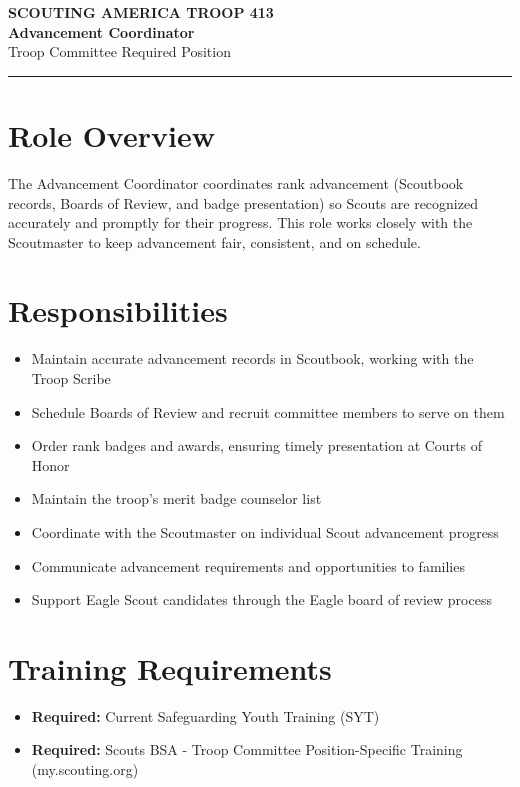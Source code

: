 \documentclass[11pt, letterpaper]{article}
\begin{document}
\begin{center}
  {\small\color{scoutgreen}\textbf{SCOUTING AMERICA \textbullet{} TROOP 413}} \\[4pt]
  {\fontsize{20pt}{24pt}\selectfont\bfseries\color{scoutgreen} Advancement Coordinator} \\[4pt]
  {\large\color{accent} Troop Committee \textbullet{} Required Position} \\[4pt]
  \textcolor{accent}{\rule{0.6\linewidth}{1pt}}
\end{center}

\vspace{0.3em}

\begin{minipage}[t]{0.48\linewidth}
\raggedright

\section{Role Overview}
The Advancement Coordinator coordinates rank advancement (Scoutbook records, Boards of Review, and badge presentation) so Scouts are recognized accurately and promptly for their progress. This role works closely with the Scoutmaster to keep advancement fair, consistent, and on schedule.

\vspace{0.4em}
\section{Responsibilities}
\begin{itemize}
  \item Maintain accurate advancement records in Scoutbook, working with the Troop Scribe
  \item Schedule Boards of Review and recruit committee members to serve on them
  \item Order rank badges and awards, ensuring timely presentation at Courts of Honor
  \item Maintain the troop's merit badge counselor list
  \item Coordinate with the Scoutmaster on individual Scout advancement progress
  \item Communicate advancement requirements and opportunities to families
  \item Support Eagle Scout candidates through the Eagle board of review process
\end{itemize}

\section{Training Requirements}
\begin{itemize}
  \item \textbf{Required:} Current Safeguarding Youth Training (SYT)
  \item \textbf{Required:} Scouts BSA - Troop Committee Position-Specific Training (my.scouting.org)
\end{itemize}

\end{minipage}
\end{document}
